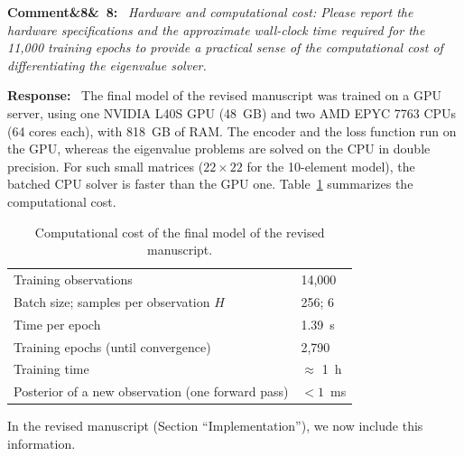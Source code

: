\documentclass[11pt]{article}
\newenvironment{rcomment}[1]{\par\bigskip\noindent\textbf{Comment\ifx&#1&\else\ #1\fi:}\ \itshape}{\par}
\newenvironment{response}{\par\smallskip\noindent\color{resp}\textbf{Response:}\ }{\par}
\begin{document}
\begin{rcomment}{8}
Hardware and computational cost: Please report the hardware specifications and the approximate wall-clock time
required for the 11,000 training epochs to provide a practical sense of the computational cost of differentiating the
eigenvalue solver.
\end{rcomment}

\begin{response}
The final model of the revised manuscript was trained on a GPU server, using one NVIDIA L40S GPU (48~GB) and two AMD EPYC 7763 CPUs (64 cores each), with 818~GB of RAM.
The encoder and the loss function run on the GPU, whereas the eigenvalue problems are solved on the CPU in double precision.
For such small matrices ($22\times22$ for the 10-element model), the batched CPU solver is faster than the GPU one.
Table~\ref{tab:cost} summarizes the computational cost.
\begin{table}[H]
	\centering\small
	\caption{Computational cost of the final model of the revised manuscript.}
	\label{tab:cost}
	\begin{tabular}{ll}
		\toprule
		Training observations & 14,000 \\
		Batch size; samples per observation $H$ & 256; 6 \\
		Time per epoch & 1.39~s \\
		Training epochs (until convergence) & 2,790 \\
		Training time & $\approx$ 1~h \\
		Posterior of a new observation (one forward pass) & $<1$~ms \\
		\bottomrule
	\end{tabular}
\end{table}

In the revised manuscript (Section ``Implementation''), we now include this information. 


\end{response}
\end{document}
